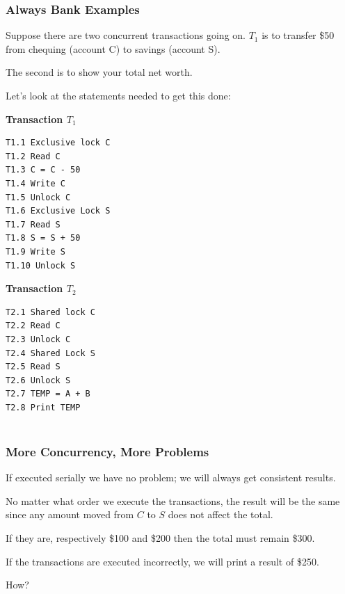 \begin{frame}[fragile]
\frametitle{Always Bank Examples}

Suppose there are two concurrent transactions going on. $T_{1}$ is to transfer \$50 from chequing (account C) to savings (account S). 

The second is to show your total net worth.

Let's look at the statements needed to get this done:

\begin{multicols}{2}
\textbf{Transaction $T_{1}$}
\begin{verbatim}
T1.1 Exclusive lock C
T1.2 Read C
T1.3 C = C - 50
T1.4 Write C
T1.5 Unlock C
T1.6 Exclusive Lock S
T1.7 Read S
T1.8 S = S + 50
T1.9 Write S
T1.10 Unlock S
\end{verbatim}

\columnbreak
\textbf{Transaction $T_{2}$}
\begin{verbatim}
T2.1 Shared lock C
T2.2 Read C
T2.3 Unlock C
T2.4 Shared Lock S
T2.5 Read S
T2.6 Unlock S
T2.7 TEMP = A + B
T2.8 Print TEMP


\end{verbatim}
\end{multicols}


\end{frame}

\begin{frame}
\frametitle{More Concurrency, More Problems}

If executed serially we have no problem; we will always get consistent results. 

No matter what order we execute the transactions, the result will be the same since any amount moved from $C$ to $S$ does not affect the total. 

If they are, respectively \$100 and \$200 then the total must remain \$300. 

If the transactions are executed incorrectly, we will print a result of \$250. 

How?


\end{frame}

